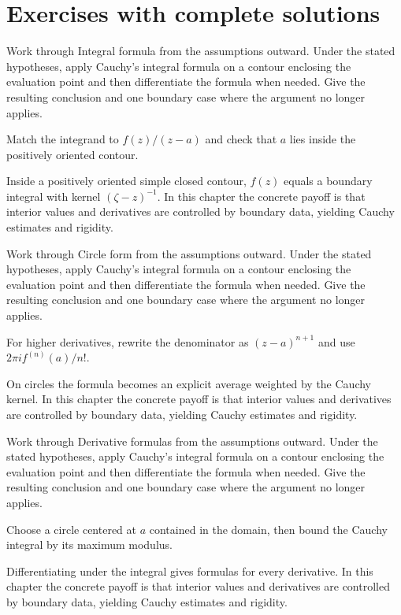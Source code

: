 \section{Exercises with complete solutions}

\begin{exercise}\label{exr:iv06-01}
Work through Integral formula from the assumptions outward. Under the stated hypotheses, apply Cauchy's integral formula on a contour enclosing the evaluation point and then differentiate the formula when needed. Give the resulting conclusion and one boundary case where the argument no longer applies.
\end{exercise}
\begin{hint}
Match the integrand to \(f(z)/(z-a)\) and check that \(a\) lies inside the positively oriented contour.
\end{hint}
\begin{solution}
Inside a positively oriented simple closed contour, $f(z)$ equals a boundary integral with kernel $(\zeta-z)^{-1}$. In this chapter the concrete payoff is that interior values and derivatives are controlled by boundary data, yielding Cauchy estimates and rigidity.
\end{solution}

\begin{exercise}\label{exr:iv06-02}
Work through Circle form from the assumptions outward. Under the stated hypotheses, apply Cauchy's integral formula on a contour enclosing the evaluation point and then differentiate the formula when needed. Give the resulting conclusion and one boundary case where the argument no longer applies.
\end{exercise}
\begin{hint}
For higher derivatives, rewrite the denominator as \((z-a)^{n+1}\) and use \(2\pi i f^{(n)}(a)/n!\).
\end{hint}
\begin{solution}
On circles the formula becomes an explicit average weighted by the Cauchy kernel. In this chapter the concrete payoff is that interior values and derivatives are controlled by boundary data, yielding Cauchy estimates and rigidity.
\end{solution}

\begin{exercise}\label{exr:iv06-03}
Work through Derivative formulas from the assumptions outward. Under the stated hypotheses, apply Cauchy's integral formula on a contour enclosing the evaluation point and then differentiate the formula when needed. Give the resulting conclusion and one boundary case where the argument no longer applies.
\end{exercise}
\begin{hint}
Choose a circle centered at \(a\) contained in the domain, then bound the Cauchy integral by its maximum modulus.
\end{hint}
\begin{solution}
Differentiating under the integral gives formulas for every derivative. In this chapter the concrete payoff is that interior values and derivatives are controlled by boundary data, yielding Cauchy estimates and rigidity.
\end{solution}

